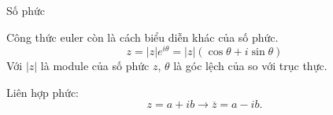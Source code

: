 \begin{frame}{Số phức}
    \begin{mdframed}[backgroundcolor=BlueDefault!10, linecolor=BlueDefault, linewidth=0.5pt, roundcorner=1pt]
        Công thức euler còn là cách biểu diễn khác của số phức.
        \begin{equation}
            z = |z| e^{i\theta} = |z|(\cos{\theta} + i \sin{\theta})
            \label{eq:1.1_3}
        \end{equation}
        Với \(|z|\) là module của số phức \(z\), \(\theta\) là góc lệch của so với trục thực.
    \end{mdframed}
    \begin{center}
        \begin{minipage}{0.4\linewidth}
        \resizebox{1\linewidth}{!}{}
        \end{minipage}
        \hspace{3mm}
        \begin{minipage}{0.35\linewidth}
        Liên hợp phức: 
        \begin{equation}
            z = a + ib \rightarrow \overline{z} = a - ib.
            \label{eq:1.1_4}
        \end{equation}
        \end{minipage}
    \end{center}
\end{frame}